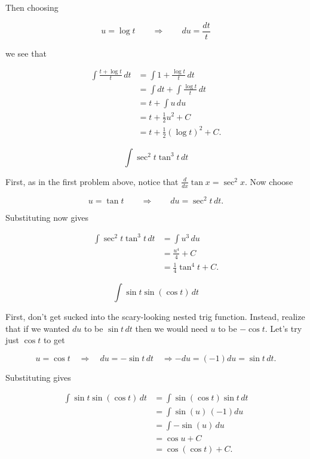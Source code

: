 \documentclass[12pt, letterpaper]{article}
\begin{document}
Then choosing

$$u = \log{t} \qquad\Rightarrow\qquad du = \frac{dt}{t}$$

we see that

\begin{equation}
\begin{aligned}
\int \frac{t + \log{t}}{t} \, dt
  &= \int 1 + \frac{\log{t}}{t} \, dt \\[0.2in]
  &= \int dt + \int \frac{\log{t}}{t} \, dt \\[0.2in]
  &= t + \int u \, du \\[0.2in]
  &= t + \tfrac{1}{2}u^2 + C \\[0.2in]
  &= t + \tfrac{1}{2}\left(\log{t}\right)^2 + C.
\end{aligned}
\end{equation}

\newpage

$$ \int \sec^2{t}\tan^3{t} \, dt $$

First, as in the first problem above, notice that $\frac{d}{dx}\tan{x} = \sec^2{x}$.
Now choose

$$u = \tan{t} \qquad\Rightarrow\qquad du = \sec^2{t} \, dt.$$

Substituting now gives

\begin{equation}
\begin{aligned}
\int \sec^2{t}\tan^3{t} \, dt
  &= \int u^3 \, du \\[0.2in]
  &= \frac{u^4}{4} + C \\[0.2in]
  &= \tfrac{1}{4}\tan^4{t} + C.
\end{aligned}
\end{equation}

\newpage

$$ \int \sin{t}\sin{(\cos{t})} \, dt $$

First, don't get sucked into the scary-looking nested trig function. Instead, realize that if we wanted $du$ to be $\sin{t} \, dt$ then we would need $u$ to be $-\cos{t}$. Let's try just $\cos{t}$ to get

$$u = \cos{t} \quad\Rightarrow\quad du = -\sin{t} \, dt \quad\Rightarrow -du = (-1)du = \sin{t} \, dt.$$

Substituting gives

\begin{equation}
\begin{aligned}
\int \sin{t}\sin{(\cos{t})} \, dt
  &= \int \sin{(\cos{t})}\sin{t} \, dt \\[0.2in]
  &= \int \sin{(u)} \, (-1)du \\[0.2in]
  &= \int -\sin{(u)} \, du \\[0.2in]
  &= \cos{u} + C \\[0.2in]
  &= \cos{(\cos{t})} + C.
\end{aligned}
\end{equation}
\end{document}
